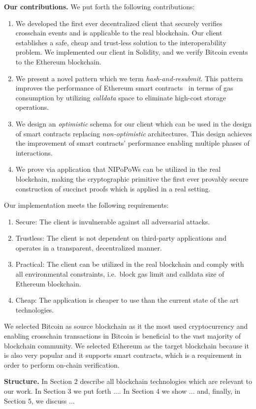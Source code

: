 \textbf{Our contributions.} We put forth the following contributions:
\begin{enumerate}
\item We developed the first ever decentralized client that securely verifies
crosschain events and is applicable to the real blockchain. Our client
establishes a safe, cheap and trust-less solution to the interoperability
problem. We implemented our client in Solidity, and we verify Bitcoin events
to the Ethereum blockchain.
\item We present a novel pattern which we term \emph{hash-and-resubmit}. This
pattern improves the performance of Ethereum smart contracts~\cite{wood,
buterin} in terms of gas consumption by utilizing \emph{calldata} space to
eliminate high-cost storage operations.
\item We design an \emph{optimistic} schema for our client which can be used in
the design of smart contracts replacing \emph{non-optimistic}
architectures. This design achieves the improvement of smart contracts'
performance enabling multiple phases of interactions.
\item We prove via application that NIPoPoWs can be utilized in the real
blockchain, making the cryptographic primitive the first ever provably secure
construction of succinct proofs which is applied in a real setting.
\end{enumerate}

\bigbreak
Our implementation meets the following requirements:
\begin{enumerate}
\item Secure: The client is invulnerable against all adversarial attacks.
\item Trustless: The client is not dependent on third-party applications
and operates in a transparent, decentralized manner.
\item Practical: The client can be utilized in the real blockchain and
comply with all environmental constraints, i.e.\ block gas limit and calldata
size of Ethereum blockchain.
\item Cheap: The application is cheaper to use than the current state of the
art technologies.
\end{enumerate}

We selected Bitcoin as source blockchain as it the most used cryptocurrency and
enabling crosschain transactions in Bitcoin is beneficial to the vast majority
of blockchain community. We selected Ethereum as the target blockchain because
it is also very popular and it supports smart contracts, which is a requirement
in order to perform on-chain verification.

\noindent

\textbf{Structure.} In Section 2 describe all blockchain technologies which are
relevant to our work. In Section 3 we put forth .... In Section 4 we show
... and, finally, in Section 5, we discuss ...


